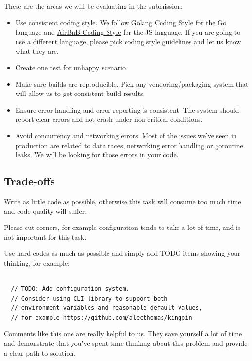 \documentclass{article}
\begin{document}
These are the areas we will be evaluating in the submission:

  \begin{itemize}
  \item Use consistent coding style. We follow \href{https://github.com/golang/go/wiki/CodeReviewComments}{Golang Coding Style} for the Go language and \href{https://github.com/airbnb/javascript}{AirBnB Coding Style} for the JS language. If you are going to use a different language, please pick coding style guidelines and let us know what they are.
  \item Create one test for unhappy scenario.
  \item Make sure builds are reproducible. Pick any vendoring/packaging system that will allow us to get consistent build results.
  \item Ensure error handling and error reporting is consistent. The system should report clear errors and not crash under non-critical conditions.
  \item Avoid concurrency and networking errors. Most of the issues we've seen in production are related to data races, networking error handling or goroutine leaks. We will be looking for those errors in your code.
  \end{itemize}

\subsection{Trade-offs}
       
Write as little code as possible, otherwise this task will consume too much time and code quality will suffer.

Please cut corners, for example configuration tends to take a lot of time, and is not important for this task.

Use hard codes as much as possible and simply add TODO items showing your thinking, for example:

\begin{lstlisting}[caption=TODO example]
  
  // TODO: Add configuration system.
  // Consider using CLI library to support both
  // environment variables and reasonable default values,
  // for example https://github.com/alecthomas/kingpin

\end{lstlisting}

Comments like this one are really helpful to us.
They save yourself a lot of time and demonstrate that you've spent time thinking about this problem and provide a clear path to solution.
\end{document}
